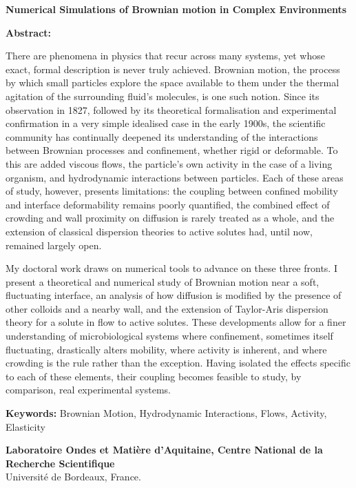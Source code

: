\documentclass[french,12pt,a4paper]{report}
\begin{document}
\begin{small}
\begin{center}
\textbf{Numerical Simulations of Brownian motion in Complex Environments}
\end{center}
\textbf{Abstract:} 

There are phenomena in physics that recur across many systems, yet whose exact, formal description is never truly achieved. Brownian motion, the process by which small particles explore the space available to them under the thermal agitation of the surrounding fluid's molecules, is one such notion. Since its observation in 1827, followed by its theoretical formalisation and experimental confirmation in a very simple idealised case in the early 1900s, the scientific community has continually deepened its understanding of the interactions between Brownian processes and confinement, whether rigid or deformable. To this are added viscous flows, the particle's own activity in the case of a living organism, and hydrodynamic interactions between particles. Each of these areas of study, however, presents limitations: the coupling between confined mobility and interface deformability remains poorly quantified, the combined effect of crowding and wall proximity on diffusion is rarely treated as a whole, and the extension of classical dispersion theories to active solutes had, until now, remained largely open.

My doctoral work draws on numerical tools to advance on these three fronts. I present a theoretical and numerical study of Brownian motion near a soft, fluctuating interface, an analysis of how diffusion is modified by the presence of other colloids and a nearby wall, and the extension of Taylor-Aris dispersion theory for a solute in flow to active solutes. These developments allow for a finer understanding of microbiological systems where confinement, sometimes itself fluctuating, drastically alters mobility, where activity is inherent, and where crowding is the rule rather than the exception. Having isolated the effects specific to each of these elements, their coupling becomes feasible to study, by comparison, real experimental systems.


\textbf{Keywords:} Brownian Motion, Hydrodynamic Interactions, Flows, Activity, Elasticity \\
\noindent\makebox[\linewidth]{\rule{\textwidth}{0.4pt}}

\vfill
{}
\begin{center}
    \textbf{Laboratoire Ondes et Matière d'Aquitaine, Centre National de la Recherche Scientifique}\\
Université de Bordeaux, France.
\end{center}
\end{small}
\vfill
\end{document}
